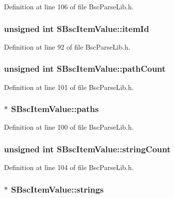 Definition at line 106 of file BscParseLib.h.\hypertarget{struct_s_bsc_item_value_2e453ac03f7a690ef1350e7f3f8e97cc}{
\subsubsection[{itemId}]{\setlength{\rightskip}{0pt plus 5cm}unsigned int {\bf SBscItemValue::itemId}}}
\label{struct_s_bsc_item_value_2e453ac03f7a690ef1350e7f3f8e97cc}




Definition at line 92 of file BscParseLib.h.\hypertarget{struct_s_bsc_item_value_e2e775d9f815602fac6609d1e7c54dd9}{
\subsubsection[{pathCount}]{\setlength{\rightskip}{0pt plus 5cm}unsigned int {\bf SBscItemValue::pathCount}}}
\label{struct_s_bsc_item_value_e2e775d9f815602fac6609d1e7c54dd9}




Definition at line 101 of file BscParseLib.h.\hypertarget{struct_s_bsc_item_value_cff0f8cfb02c49a620a63d19c7d9090e}{
\subsubsection[{paths}]{$\ast$ {\bf SBscItemValue::paths}}}
\label{struct_s_bsc_item_value_cff0f8cfb02c49a620a63d19c7d9090e}




Definition at line 100 of file BscParseLib.h.\hypertarget{struct_s_bsc_item_value_152bb01d2020b1559b77f008e8cf7f91}{
\subsubsection[{stringCount}]{\setlength{\rightskip}{0pt plus 5cm}unsigned int {\bf SBscItemValue::stringCount}}}
\label{struct_s_bsc_item_value_152bb01d2020b1559b77f008e8cf7f91}




Definition at line 104 of file BscParseLib.h.\hypertarget{struct_s_bsc_item_value_0d3b6e99f40432b484d8e653b2afd127}{
\subsubsection[{strings}]{$\ast$ {\bf SBscItemValue::strings}}}
\label{struct_s_bsc_item_value_0d3b6e99f40432b484d8e653b2afd127}





